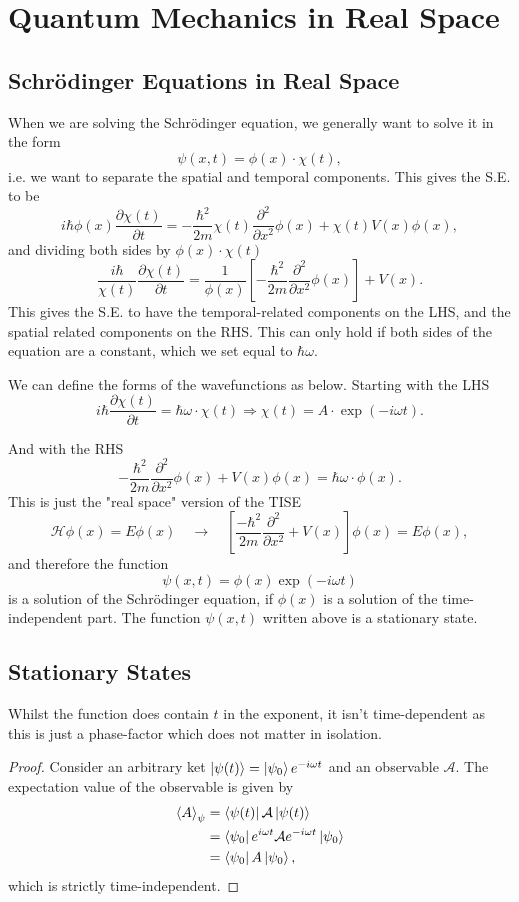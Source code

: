 \documentclass{article}
\begin{document}
\section{Quantum Mechanics in Real Space}
\subsection{Schr\"odinger Equations in Real Space}
When we are solving the Schr\"odinger equation, we generally want to solve it in the form
\[
    \psi (x,t)=\phi (x)\cdot\chi (t),
\]
i.e. we want to separate the spatial and temporal components. This gives the S.E. to be
\[
    i \hbar\phi (x)\frac{\partial \chi (t)}{\partial t}=-\frac{\hbar^2}{2m}\chi (t)\frac{\partial^2}{\partial x^2}\phi (x)+\chi (t)V(x)\phi (x),
\]
and dividing both sides by $\phi (x)\cdot\chi (t)$
\[
    \frac{i \hbar}{\chi (t)}\frac{\partial \chi (t)}{\partial t}=\frac{1}{\phi (x)}\left[ -\frac{\hbar^2}{2m}\frac{\partial^2}{\partial x^2}\phi (x) \right]+V(x).
\]
This gives the S.E. to have the temporal-related components on the LHS, and the spatial related components on the RHS. This can only hold if both sides of the equation are a constant, which we set equal to $\hbar\omega $.

We can define the forms of the wavefunctions as below. Starting with the LHS
\[
    i \hbar \frac{\partial \chi (t)}{\partial t}=\hbar\omega \cdot\chi (t)\Rightarrow\chi (t)=A\cdot \exp(-i\omega t).
\]

And with the RHS
\[
    -\frac{\hbar^2}{2m}\frac{\partial^2}{\partial x^2}\phi (x)+V(x)\phi (x)=\hbar\omega \cdot\phi (x).
\]
This is just the "real space" version of the TISE
\[
    \mathcal{H}\phi (x)=E\phi (x)\quad \to\quad \left[ \frac{-\hbar^2}{2m}\frac{\partial^2}{\partial x^2}+V(x) \right]\phi (x)=E\phi (x),
\]
and therefore the function
\[
    \psi (x,t)=\phi (x)\exp(-i\omega t)
\]
is a solution of the Schr\"odinger equation, if $\phi (x)$ is a solution of the time-independent part. The function $\psi (x,t)$ written above is a stationary state.

\subsection{Stationary States}
Whilst the function does contain $t$ in the exponent, it isn't time-dependent as this is just a phase-factor which does not matter in isolation.
\begin{proof}
    Consider an arbitrary ket $\ket{\psi (t)}=\ket{\psi_0}e^{-i\omega t}$ and an observable $\mathcal{A}$. The expectation value of the observable is given by
    \begin{align*}
        \left\langle A \right\rangle _\psi  &= \bra{\psi (t)}\mathcal{A} \ket{\psi (t)} \\
                                            &= \bra{\psi _0}e^{i\omega t}\mathcal{A}e^{-i\omega t}\ket{\psi _0} \\
                                            &= \bra{\psi _0}A \ket{\psi _0},
    \end{align*}
    which is strictly time-independent.
\end{proof}
\end{document}
